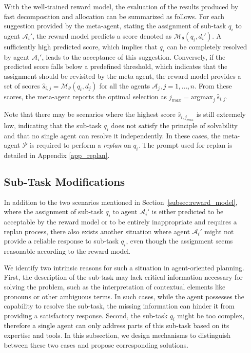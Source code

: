 With the well-trained reward model, the evaluation of the results produced by fast decomposition and allocation can be summarized as follows. For each suggestion provided by the meta-agent, stating the assignment of sub-task $q_i$ to agent $\mathcal{A}_i'$, the reward model predicts a score denoted as $\mathcal{M}_\theta(q_i, d_i')$. A sufficiently high predicted score, which implies that $q_i$ can be completely resolved by agent $\mathcal{A}_i'$, leads to the acceptance of this suggestion. Conversely, if the predicted score falls below a predefined threshold, which indicates that the assignment should be revisited by the meta-agent, the reward model provides a set of scores $\hat{s}_{i,j}=\mathcal{M}_\theta(q_i, d_j)$ for all the agents $\mathcal{A}_j, j=1,...,n$. From these scores, the meta-agent reports the optimal selection as $j_{max}=\mathrm{argmax}_j\,\hat{s}_{i,j}$.

Note that there may be scenarios where the highest score $\hat{s}_{i, j_{max}}$ is still extremely low, indicating that the sub-task $q_i$ does not satisfy the principle of solvability and that no single agent can resolve it independently. In these cases, the meta-agent $\mathcal{P}$ is required to perform a {\it replan} on $q_i$.
The prompt used for replan is detailed in Appendix \ref{app_replan}.





\subsection{Sub-Task Modifications}
\label{subsec:task_modifications}
In addition to the two scenarios mentioned in Section~\ref{subsec:reward_model}, where the assignment of sub-task $q_i$ to agent $\mathcal{A}_i'$ is either predicted to be acceptable by the reward model or to be entirely inappropriate and requires a replan process, there also exists another situation where agent $\mathcal{A}_i'$ might not provide a reliable response to sub-task $q_i$, even though the assignment seems reasonable according to the reward model.

We identify two intrinsic reasons for such a situation in agent-oriented planning.
First, the description of the sub-task may lack critical information necessary for solving the problem, such as the interpretation of contextual elements like pronouns or other ambiguous terms. In such cases, while the agent possesses the capability to resolve the sub-task, the missing information can hinder it from providing a satisfactory response.
Second, the sub-task $q_i$ might be too complex, therefore a single agent can only address parts of this sub-task based on its expertise and tools. 
In this subsection, we design mechanisms to distinguish between these two cases and propose corresponding solutions. 

